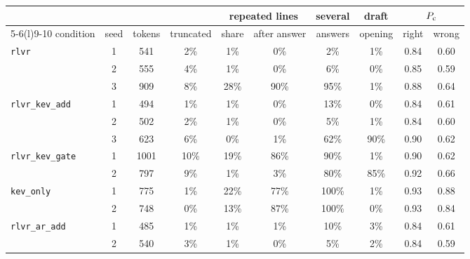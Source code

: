 \begin{tabular}{@{}lccccccccc@{}}
\toprule
 & & & & \multicolumn{2}{c}{repeated lines} & several & draft & \multicolumn{2}{c}{\kev{} $P_{\mathrm{c}}$} \\ \cmidrule(lr){5-6}\cmidrule(l){9-10}
condition & seed & tokens & truncated & share & after answer & answers & opening & right & wrong \\ \midrule
\texttt{rlvr} & 1 & 541 & 2\% & 1\% & 0\% & 2\% & 1\% & 0.84 & 0.60 \\
 & 2 & 555 & 4\% & 1\% & 0\% & 6\% & 0\% & 0.85 & 0.59 \\
 & 3 & 909 & 8\% & 28\% & 90\% & 95\% & 1\% & 0.88 & 0.64 \\
\addlinespace
\texttt{rlvr\_kev\_add} & 1 & 494 & 1\% & 1\% & 0\% & 13\% & 0\% & 0.84 & 0.61 \\
 & 2 & 502 & 2\% & 1\% & 0\% & 5\% & 1\% & 0.84 & 0.60 \\
 & 3 & 623 & 6\% & 0\% & 1\% & 62\% & 90\% & 0.90 & 0.62 \\
\addlinespace
\texttt{rlvr\_kev\_gate} & 1 & 1001 & 10\% & 19\% & 86\% & 90\% & 1\% & 0.90 & 0.62 \\
 & 2 & 797 & 9\% & 1\% & 3\% & 80\% & 85\% & 0.92 & 0.66 \\
\addlinespace
\texttt{kev\_only} & 1 & 775 & 1\% & 22\% & 77\% & 100\% & 1\% & 0.93 & 0.88 \\
 & 2 & 748 & 0\% & 13\% & 87\% & 100\% & 0\% & 0.93 & 0.84 \\
\addlinespace
\texttt{rlvr\_ar\_add} & 1 & 485 & 1\% & 1\% & 1\% & 10\% & 3\% & 0.84 & 0.61 \\
 & 2 & 540 & 3\% & 1\% & 0\% & 5\% & 2\% & 0.84 & 0.59 \\
\bottomrule
\end{tabular}
